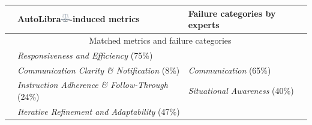 \begin{table}[!t]
	\centering
	\renewcommand{\arraystretch}{1.2} %
	\begin{tabular}{@{}lp{}p{}@{}}
		\toprule                                                                                          & \textbf{AutoLibra\protect\includegraphics[height=1em]{figs/scale.png}-induced metrics}                                                                                                                                                        & \textbf{Failure categories by experts}                                    \\
		\midrule \multirow{11}{*}{\rotatebox[origin=c]{90}{\textbf{CoGym} \citep{shao2024collaborative}}} & \multicolumn{2}{c}{Matched metrics and failure categories}                                                                                                                                                                                     \\
		\cmidrule(lr){2-3}                                                                                & \cellcolor{comm}\textit{Responsiveness and Efficiency} (75\%)                                                                                                                                                                                 & \cellcolor{comm}                                                          \\
		                                                                                                  & \cellcolor{comm}\textit{Communication Clarity \& Notification} (8\%)                                                                                                                                                                          & \multirow{-2}{*}{\cellcolor{comm}\textit{Communication} (65\%)}           \\
		                                                                                                  & \cellcolor{sit}\textit{Instruction Adherence \& Follow-Through} (24\%)                                                                                                                                                                        & \cellcolor{sit}\textit{Situational Awareness} (40\%)                      \\
		                                                                                                  & \cellcolor{plan}\textit{Iterative Refinement and Adaptability} (47\%)                                                                                                                                                                         & \cellcolor{plan}                                                          \\

\end{tabular}
\end{table}
